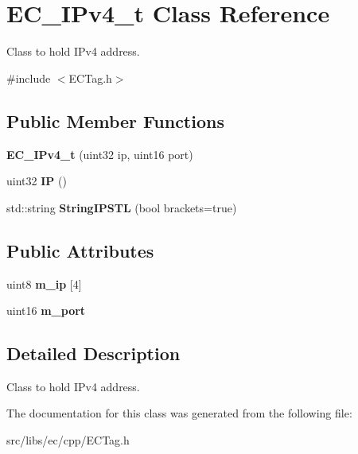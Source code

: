 \section{EC\_\-IPv4\_\-t Class Reference}
\label{classEC__IPv4__t}


Class to hold IPv4 address.  


{\ttfamily \#include $<$ECTag.h$>$}\subsection*{Public Member Functions}
\begin{DoxyCompactItemize}
\item 
{\bfseries EC\_\-IPv4\_\-t} (uint32 ip, uint16 port)\label{classEC__IPv4__t_a2128003ce975213e19be673e19ebb237}

\item 
uint32 {\bfseries IP} ()\label{classEC__IPv4__t_a0168457afdbc347a1582110e8a4e0841}

\item 
std::string {\bfseries StringIPSTL} (bool brackets=true)\label{classEC__IPv4__t_a8003de94184f2c9131c8d0ff19877c29}

\end{DoxyCompactItemize}
\subsection*{Public Attributes}
\begin{DoxyCompactItemize}
\item 
uint8 {\bfseries m\_\-ip} [4]\label{classEC__IPv4__t_a3d606eafc71fd113e9ec11b1e50a1ac8}

\item 
uint16 {\bfseries m\_\-port}\label{classEC__IPv4__t_a1d1b71bd62a1d42d16d2420bd78b8ec9}

\end{DoxyCompactItemize}


\subsection{Detailed Description}
Class to hold IPv4 address. 

The documentation for this class was generated from the following file:\begin{DoxyCompactItemize}
\item 
src/libs/ec/cpp/ECTag.h\end{DoxyCompactItemize}
